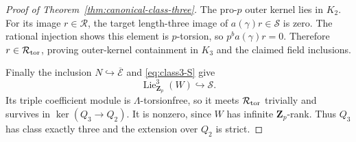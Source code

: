 \begin{proof}[Proof of Theorem~\ref{thm:canonical-class-three}]
The pro-$p$ outer kernel lies in \(K_2\).
For its image \(r\in \mathcal R\), the target length-three image
of \(a(\gamma)r\in \mathcal S\) is zero. The rational injection
shows this element is \(p\)-torsion, so
\(p^ba(\gamma)r=0\). Therefore \(r\in \mathcal R_{\rm tor}\), proving
outer-kernel containment in \(K_3\) and the claimed field
inclusions.

Finally the inclusion \(N\hookrightarrow\overline{\mathcal E}\) and
\eqref{eq:class3-S} give
\[
 \operatorname{Lie}^3_{\mathbf Z_p}(W)\hookrightarrow \mathcal S.
\]
Its triple coefficient module is \(\Lambda\)-torsionfree,
so it meets \(\mathcal R_{\rm tor}\) trivially and survives in
\(\ker(Q_3\to Q_2)\).
It is nonzero, since \(W\) has infinite \(\mathbf Z_p\)-rank.
Thus \(Q_3\) has class exactly three and the extension over
\(Q_2\) is strict.
\end{proof}

